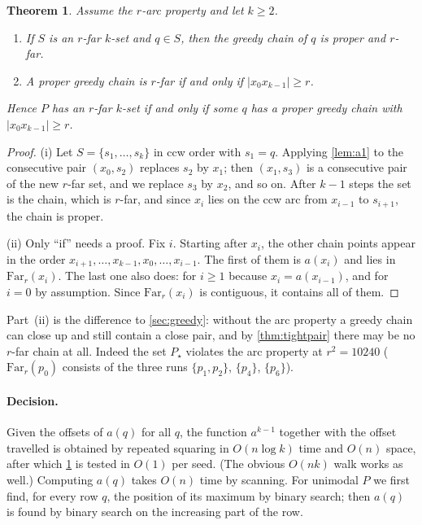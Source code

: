 \documentclass[11pt,a4paper]{article}
\newtheorem{theorem}{Theorem}
\theoremstyle{definition}
\theoremstyle{remark}
\begin{document}
\begin{theorem}\label{thm:arc}
Assume the $r$-arc property and let $k\ge2$.
\begin{enumerate}[label=(\roman*),itemsep=1pt,topsep=2pt]
\item If $S$ is an $r$-far $k$-set and $q\in S$, then the greedy chain of $q$
is proper and $r$-far.
\item A proper greedy chain is $r$-far if and only if $|x_0x_{k-1}|\ge r$.
\end{enumerate}
Hence $P$ has an $r$-far $k$-set if and only if some $q$ has a proper greedy
chain with $|x_0x_{k-1}|\ge r$.
\end{theorem}
\begin{proof}
(i) Let $S=\{s_1,\dots,s_k\}$ in ccw order with $s_1=q$. Applying
\cref{lem:a1} to the consecutive pair $(x_0,s_2)$ replaces $s_2$ by $x_1$;
then $(x_1,s_3)$ is a consecutive pair of the new $r$-far set, and we replace
$s_3$ by $x_2$, and so on. After $k-1$ steps the set is the chain, which is
$r$-far, and since $x_i$ lies on the ccw arc from $x_{i-1}$ to $s_{i+1}$, the
chain is proper.

(ii) Only ``if'' needs a proof. Fix $i$. Starting after $x_i$, the other
chain points appear in the order
$x_{i+1},\dots,x_{k-1},x_0,\dots,x_{i-1}$. The first of them is $a(x_i)$ and
lies in $\mathrm{Far}_r(x_i)$. The last one also does: for $i\ge1$ because
$x_i=a(x_{i-1})$, and for $i=0$ by assumption. Since $\mathrm{Far}_r(x_i)$ is
contiguous, it contains all of them.
\end{proof}

Part~(ii) is the difference to \cref{sec:greedy}: without the arc property a
greedy chain can close up and still contain a close pair, and by
\cref{thm:tightpair} there may be no $r$-far chain at all. Indeed the set
$P_\star$ violates the arc property at $r^2=10240$ ($\mathrm{Far}_r(p_0)$
consists of the three runs $\{p_1,p_2\}$, $\{p_4\}$, $\{p_6\}$).

\paragraph{Decision.}
Given the offsets of $a(q)$ for all $q$, the function $a^{k-1}$ together with
the offset travelled is obtained by repeated squaring in $O(n\log k)$ time and
$O(n)$ space, after which \cref{thm:arc} is tested in $O(1)$ per seed. (The
obvious $O(nk)$ walk works as well.) Computing $a(q)$ takes $O(n)$ time by
scanning. For unimodal $P$ we first find, for every row $q$, the position of
its maximum by binary search; then $a(q)$ is found by binary search on the
increasing part of the row.
\end{document}
